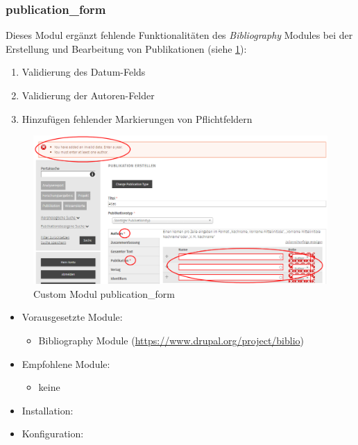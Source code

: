 \subsubsection{publication\_form}\label{subsub:publicationform}
Dieses Modul ergänzt fehlende Funktionalitäten des \textit{Bibliography} Modules bei der Erstellung und Bearbeitung von Publikationen (siehe \cref{fig:example_publicationform}):
\begin{enumerate}
	\item Validierung des Datum-Felds
	\item Validierung der Autoren-Felder
	\item Hinzufügen fehlender Markierungen von Pflichtfeldern
\end{enumerate}

\begin{figure}[H]
	\centering
	\includegraphics[height=0.20\textheight]{images/example_publicationform}
	\caption{Custom Modul publication\_form}
	\label{fig:example_publicationform}
\end{figure}

\begin{itemize}[parsep=0pt, itemsep=5.0pt plus 2.0pt minus 1.0pt, leftmargin=*]
	\item Vorausgesetzte Module:
	\begin{itemize}
		\item Bibliography Module (\url{https://www.drupal.org/project/biblio})
	\end{itemize}
	
	\item Empfohlene Module:
	\begin{itemize}
		\item keine
	\end{itemize}
	
	\item Installation: \standardinstall
	
	\item Konfiguration: 
	
	\noconfig
	
	
\end{itemize}


